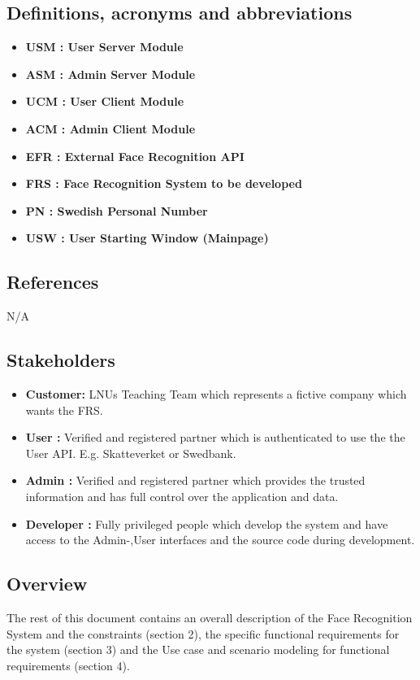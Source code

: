 \documentclass[a4paper,11pt]{article}
\begin{document}
 
\subsection{Definitions, acronyms and abbreviations}
\begin{itemize}
\item \textbf{USM : User Server Module}
\item \textbf{ASM : Admin Server Module}
\item \textbf{UCM : User Client Module}
\item \textbf{ACM : Admin Client Module}
\item \textbf{EFR : External Face Recognition API}
\item \textbf{FRS : Face Recognition System to be developed}
\item \textbf{PN : Swedish Personal Number}
\item \textbf{USW : User Starting Window (Mainpage)}
\end{itemize}

\subsection{References}
N/A
\subsection{Stakeholders} \label{Roles}
\begin{itemize}
\item \textbf{Customer: } LNUs Teaching Team which represents a fictive company which wants the FRS.
\item \textbf{User :} Verified and registered partner which is authenticated to use the the User API. E.g. Skatteverket or Swedbank.
\item \textbf{Admin :} Verified and registered partner which provides the trusted information and has full control over the application and data.
\item \textbf{Developer :} Fully privileged people which develop the system and have access to the Admin-,User interfaces and the source code during development. 
\end{itemize}

\subsection{Overview}
The rest of this document contains an overall description of the Face Recognition System and the constraints (section 2), the specific functional requirements for the system (section 3) and the Use case and scenario modeling for functional requirements (section 4).
\end{document}

